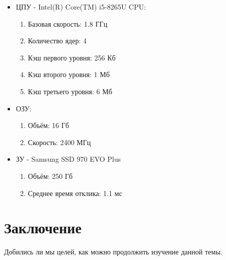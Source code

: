 \begin{itemize}
	\item ЦПУ - Intel(R) Core(TM) i5-8265U CPU:
	\begin{enumerate}
		\item Базовая скорость: 1.8 ГГц
		\item Количество ядер: 4
		\item Кэш первого уровня: 256 Кб
		\item Кэш второго уровня: 1 Мб
		\item Кэш третьего уровня: 6 Мб
	\end{enumerate}
	\item ОЗУ:
	\begin{enumerate}
		\item Объём: 16 Гб
		\item Скорость: 2400 МГц
	\end{enumerate}
	\item ЗУ - Samsung SSD 970 EVO Plus
	\begin{enumerate}
		\item Объём: 250 Гб
		\item Среднее время отклика: 1.1 мс
	\end{enumerate}
\end{itemize}

\newpage
\section*{Заключение}
Добились ли мы целей, как можно продолжить изучение данной темы.
